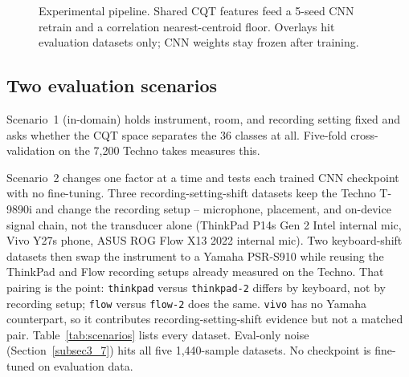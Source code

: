 \documentclass[pdflatex,sn-mathphys-num,iicol]{sn-jnl}
\theoremstyle{thmstyleone}
\theoremstyle{thmstyletwo}
\theoremstyle{thmstylethree}
\begin{document}
\begin{figure}[t]
{%
  }
  \caption{Experimental pipeline. Shared CQT features feed a 5-seed CNN retrain and a correlation nearest-centroid floor. Overlays hit evaluation datasets only; CNN weights stay frozen after training.}
  \label{fig:methodology}
\end{figure}

\subsection{Two evaluation scenarios}\label{subsec3_0}

Scenario~1 (in-domain) holds instrument, room, and recording setting fixed and asks whether the CQT space separates the 36 classes at all. Five-fold cross-validation on the 7{,}200 Techno takes measures this.

Scenario~2 changes one factor at a time and tests each trained CNN checkpoint with no fine-tuning. Three recording-setting-shift datasets keep the Techno T-9890i and change the recording setup -- microphone, placement, and on-device signal chain, not the transducer alone (ThinkPad P14s Gen 2 Intel internal mic, Vivo Y27s phone, ASUS ROG Flow X13 2022 internal mic). Two keyboard-shift datasets then swap the instrument to a Yamaha PSR-S910 while reusing the ThinkPad and Flow recording setups already measured on the Techno. That pairing is the point: \texttt{thinkpad} versus \texttt{thinkpad-2} differs by keyboard, not by recording setup; \texttt{flow} versus \texttt{flow-2} does the same. \texttt{vivo} has no Yamaha counterpart, so it contributes recording-setting-shift evidence but not a matched pair. Table~\ref{tab:scenarios} lists every dataset. Eval-only noise (Section~\ref{subsec3_7}) hits all five 1{,}440-sample datasets. No checkpoint is fine-tuned on evaluation data.
\end{document}
